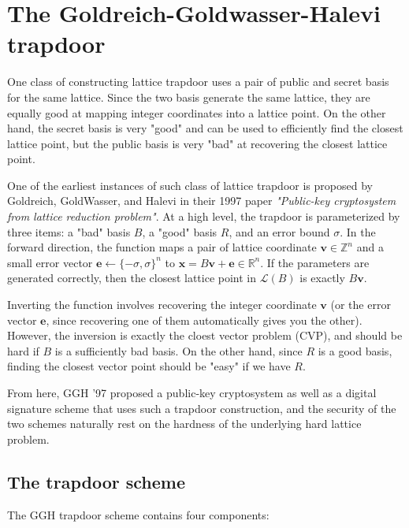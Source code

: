 \section{The Goldreich-Goldwasser-Halevi trapdoor}
One class of constructing lattice trapdoor uses a pair of public and secret basis for the same lattice. Since the two basis generate the same lattice, they are equally good at mapping integer coordinates into a lattice point. On the other hand, the secret basis is very "good" and can be used to efficiently find the closest lattice point, but the public basis is very "bad" at recovering the closest lattice point.

One of the earliest instances of such class of lattice trapdoor is proposed by Goldreich, GoldWasser, and Halevi in their 1997 paper \textit{"Public-key cryptosystem from lattice reduction problem"}. At a high level, the trapdoor is parameterized by three items: a "bad" basis $B$, a "good" basis $R$, and an error bound $\sigma$. In the forward direction, the function maps a pair of lattice coordinate $\mathbf{v} \in \mathbb{Z}^n$ and a small error vector $\mathbf{e} \leftarrow \{ -\sigma, \sigma \}^n$ to $\mathbf{x} = B\mathbf{v} + \mathbf{e} \in \mathbb{R}^n$. If the parameters are generated correctly, then the closest lattice point in $\mathcal{L}(B)$ is exactly $B\mathbf{v}$.

Inverting the function involves recovering the integer coordinate $\mathbf{v}$ (or the error vector $\mathbf{e}$, since recovering one of them automatically gives you the other). However, the inversion is exactly the cloest vector problem (CVP), and should be hard if $B$ is a sufficiently bad basis. On the other hand, since $R$ is a good basis, finding the closest vector point should be "easy" if we have $R$.

From here, GGH '97 proposed a public-key cryptosystem as well as a digital signature scheme that uses such a trapdoor construction, and the security of the two schemes naturally rest on the hardness of the underlying hard lattice problem.

\subsection{The trapdoor scheme}
The GGH trapdoor scheme contains four components:


